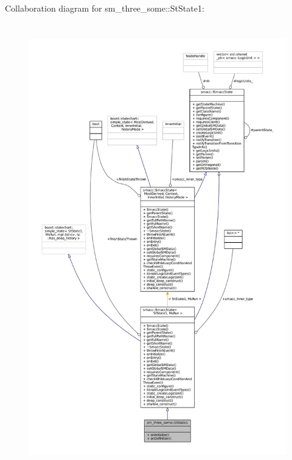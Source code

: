 Collaboration diagram for sm\+\_\+three\+\_\+some\+:\+:St\+State1\+:
\nopagebreak
\begin{figure}[H]
\begin{center}
\leavevmode
\includegraphics[height=550pt]{structsm__three__some_1_1StState1__coll__graph}
\end{center}
\end{figure}
